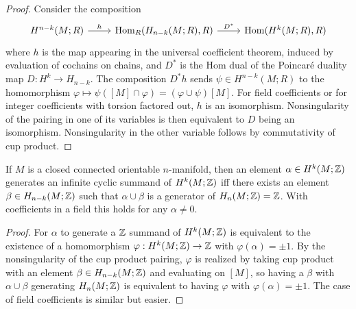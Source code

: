 \begin{proof}
Consider the composition
\[\begin{tikzcd}
H^{n-k}(M;R)\ar[r,"h"]&\Hom_R(H_{n-k}(M;R),R)\ar[r,"D^*"]&\Hom(H^{k}(M;R),R)
\end{tikzcd}\]
where $h$ is the map appearing in the universal coefficient theorem, induced by evaluation of cochains on chains, and $D^*$ is the Hom dual of the Poincar\'e duality map $D:H^k\to H_{n-k}$. The composition $D^*h$ sends $\psi\in H^{n-k}(M;R)$ to the homomorphism $\varphi\mapsto\psi([M]\cap\varphi)=(\varphi\cup\psi)[M]$. For field coefficients or for integer coefficients with torsion factored out, $h$ is an isomorphism. Nonsingularity of the pairing in one of its variables is then equivalent to $D$ being an isomorphism. Nonsingularity in the other variable follows by commutativity of cup product.
\end{proof}
\begin{corollary}
If $M$ is a closed connected orientable $n$-manifold, then an element $\alpha\in H^k(M;\mathbb{Z})$ generates an infinite cyclic summand of $H^k(M;\mathbb{Z})$ iff there exists an element $\beta\in H_{n-k}(M;\mathbb{Z})$ such that $\alpha\cup\beta$ is a generator of $H_n(M;\mathbb{Z})=\mathbb{Z}$. With coefficients in a field this holds for any $\alpha\neq0$.
\end{corollary}
\begin{proof}
For $\alpha$ to generate a $\mathbb{Z}$ summand of $H^k(M;\mathbb{Z})$ is equivalent to the existence of a homomorphism $\varphi:H^k(M;\mathbb{Z})\to\mathbb{Z}$ with $\varphi(\alpha)=\pm1$. By the nonsingularity of the cup product pairing, $\varphi$ is realized by taking cup product with an element $\beta\in H_{n-k}(M;\mathbb{Z})$ and evaluating on $[M]$, so having a $\beta$ with $\alpha\cup\beta$ generating $H_n(M;\mathbb{Z})$ is equivalent to having $\varphi$ with $\varphi(\alpha)=\pm1$. The case of field coefficients is similar but easier.
\end{proof}
